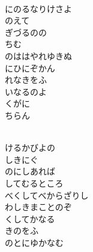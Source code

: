 \documentclass[10pt,b5j]{tarticle} %
\begin{document}
\vspace{1.5em} %
\newcommand{\linespace}{0.5em} %
\newcommand{\blocksize}{0.5\hsize} %
\newcommand{\itemmargin}{6em} %
\begin{enumerate} %
    \setlength{\itemindent}{\itemmargin} %
    \begin{minipage}[c]{\blocksize}
    
        \vspace{\linespace}
        \item~\\
        にのるなりけさよ\\
        のえて\\
        ぎづるのの\\
        ちむ\\
        のははやれゆきぬ\\
        にひにぞかん\\
        れなきをふ\\
        いなるのよ\\
        くがに\\
        ちらん
        
        \vspace{\linespace}
        \item~\\
        けるかびよの\\
        しきにぐ\\
        のにしあれば\\
        してむるところ\\
        べくしてべからざりし\\
        わしきまことのぞ\\
        くしてかなる\\
        きのをふ\\
        のとにゆかなむ
        

\end{minipage}
\end{enumerate}
\end{document}
